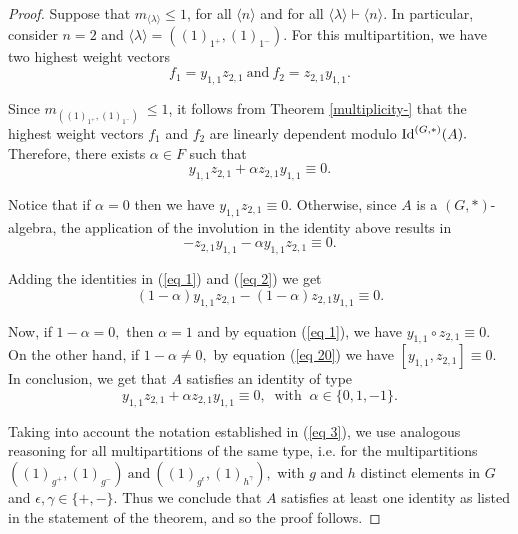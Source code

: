 \documentclass{amsart}
\newcommand{\IdG}{\ensuremath{\textnormal{Id}^{(G,\ast)}}}
\numberwithin{equation}{section}
\begin{document}
\begin{proof}
    Suppose that $m_{\langle \lambda \rangle}\le 1$, for all $\langle n \rangle$ and for all $\langle \lambda \rangle \vdash \langle n \rangle$. In particular, consider $n=2$ and $\langle \lambda \rangle = ((1)_{1^+},(1)_{1^-}).$ For this multipartition, we have two highest weight vectors  %
		$$f_1=y_{1,1}z_{2,1}
		~\mbox{and} ~
		f_2=z_{2,1}y_{1,1}.$$
	
	Since $m_{((1)_{1^+},(1)_{1^-})}\ \le 1$, it follows from Theorem \ref{multiplicity-} that the highest weight vectors $f_1$ and $f_2$ are linearly dependent modulo $\IdG(A).$
	Therefore, there exists $\alpha \in F$ such that
\begin{equation}\label{eq 1}
		y_{1,1}z_{2,1}+\alpha z_{2,1}y_{1,1}\equiv 0.
	\end{equation}

 
     Notice that if $\alpha=0$ then we have $y_{1,1}z_{2,1}\equiv 0.$ Otherwise, since $A$ is a $(G,*)$-algebra, the application of the involution in the identity above results in \begin{equation}\label{eq 2}
		-z_{2,1}y_{1,1}-\alpha y_{1,1}z_{2,1}\equiv 0.
	\end{equation}

Adding the identities in (\ref{eq 1}) and (\ref{eq 2}) we get  
      \begin{equation} 	 \label{eq 20}
		(1-\alpha)y_{1,1}z_{2,1}-(1-\alpha)z_{2,1}y_{1,1}\equiv 0.
	\end{equation}
    	
        Now, if $1-\alpha = 0,$ then $\alpha=1$ and by equation (\ref{eq 1}), we have
	$y_{1,1}\circ z_{2,1}\equiv 0.$ On the other hand, if $1-\alpha \neq 0,$ by equation (\ref{eq 20}) we have $[y_{1,1},z_{2,1}]\equiv 0.$
	In conclusion, we get that $A$ satisfies an identity of type $$y_{1,1}z_{2,1}+\alpha z_{2,1}y_{1,1}\equiv 0, \;\; \mbox{with}\;\; \alpha \in \{0, 1, -1\}.$$ 
    
    Taking into account the notation established in (\ref{eq 3}), we use analogous reasoning for all multipartitions of the same type, i.e. for the multipartitions
    $ ((1)_{g^{+}},(1)_{g^{-}})~ \mbox{and} ~ ((1)_{g^{\epsilon}},(1)_{h^{\gamma}}),$ 
 with $g$ and $h$ distinct elements in $G$ and  $\epsilon, \gamma\in \{+,-\}.$ Thus 
we conclude that $A$ satisfies at least one identity as listed in the statement of the theorem, and so the proof follows.    
\end{proof}
\end{document}

